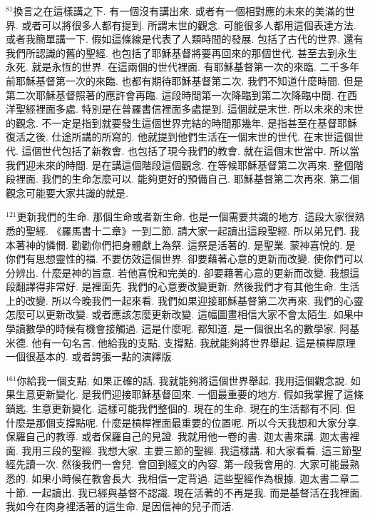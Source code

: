 \documentclass{book}
\begin{document}
$^{81}$換言之在這樣講之下.
有一個沒有講出來.
或者有一個相對應的未來的美滿的世界.
或者可以將很多人都有提到.
所謂末世的觀念.
可能很多人都用這個表達方法.
或者我簡單講一下.
假如這條線是代表了人類時間的發展.
包括了古代的世界.
還有我們所認識的舊的聖經.
也包括了耶穌基督將要再回來的那個世代.
甚至去到永生永死.
就是永恆的世界.
在這兩個的世代裡面.
有耶穌基督第一次的來臨.
二千多年前耶穌基督第一次的來臨.
也都有期待耶穌基督第二次.
我們不知道什麼時間.
但是第二次耶穌基督照著的應許會再臨.
這段時間第一次降臨到第二次降臨中間.
在西洋聖經裡面多處.
特別是在普羅書信裡面多處提到.
這個就是末世.
所以未來的末世的觀念.
不一定是指到就要發生這個世界完結的時間那幾年.
是指甚至在基督耶穌復活之後.
仕途所講的所寫的.
他就提到他們生活在一個末世的世代.
在末世這個世代.
這個世代包括了新教會.
也包括了現今我們的教會.
就在這個末世當中.
所以當我們迎未來的時間.
是在講這個階段這個觀念.
在等候耶穌基督第二次再來.
整個階段裡面.
我們的生命怎麼可以.
能夠更好的預備自己.
耶穌基督第二次再來.
第二個觀念可能要大家共識的就是.

$^{121}$更新我們的生命.
那個生命或者新生命.
也是一個需要共識的地方.
這段大家很熟悉的聖經.
《羅馬書十二章》一到二節.
請大家一起讀出這段聖經.
所以弟兄們.
我本著神的憐憫.
勸勸你們把身體獻上為祭.
這祭是活著的.
是聖業.
蒙神喜悅的.
是你們有思想靈性的福.
不要仿效這個世界.
卻要藉著心意的更新而改變.
使你們可以分辨出.
什麼是神的旨意.
若他喜悅和完美的.
卻要藉著心意的更新而改變.
我想這段翻譯得非常好.
是裡面先.
我們的心意要改變更新.
然後我們才有其他生命.
生活上的改變.
所以今晚我們一起來看.
我們如果迎接耶穌基督第二次再來.
我們的心靈怎麼可以更新改變.
或者應該怎麼更新改變.
這幅圖畫相信大家不會太陌生.
如果中學讀數學的時候有機會接觸過.
這是什麼呢.
都知道.
是一個很出名的數學家.
阿基米德.
他有一句名言.
他給我的支點.
支撐點.
我就能夠將世界舉起.
這是槓桿原理一個很基本的.
或者誇張一點的演繹版.

$^{161}$你給我一個支點.
如果正確的話.
我就能夠將這個世界舉起.
我用這個觀念說.
如果生意更新變化.
是我們迎接耶穌基督回來.
一個最重要的地方.
假如我掌握了這條鎖匙.
生意更新變化.
這樣可能我們整個的.
現在的生命.
現在的生活都有不同.
但什麼是那個支撐點呢.
什麼是槓桿裡面最重要的位置呢.
所以今天我想和大家分享.
保羅自己的教導.
或者保羅自己的見證.
我就用他一卷的書.
迦太書來講.
迦太書裡面.
我用三段的聖經.
我想大家.
主要三節的聖經.
我這樣講.
和大家看看.
這三節聖經先讀一次.
然後我們一會兒.
會回到經文的內容.
第一段我會用的.
大家可能最熟悉的.
如果小時候在教會長大.
我相信一定背過.
這些聖經作為根據.
迦太書二章二十節.
一起讀出.
我已經與基督不認識.
現在活著的不再是我.
而是基督活在我裡面.
我如今在肉身裡活著的這生命.
是因信神的兒子而活.
\end{document}
